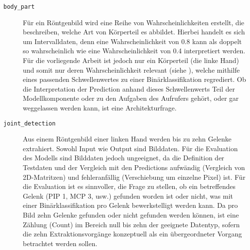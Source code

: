 \begin{description}
    \item[\texttt{body\_part}] Für ein Röntgenbild wird eine Reihe von Wahrscheinlichkeiten erstellt, die beschreiben, welche Art von Körperteil es abbildet. Hierbei handelt es sich um Intervalldaten, denn eine Wahrscheinlichkeit von 0.8 kann als doppelt so wahrscheinlich wie eine Wahrscheinlichkeit von 0.4 interpretiert werden. Für die vorliegende Arbeit ist jedoch nur ein Körperteil (die linke Hand) und somit nur deren Wahrscheinlichkeit relevant (siehe ), welche mithilfe eines passenden Schwellenwertes zu einer Binärklassifikation regrediert. Ob die Interpretation der Prediction anhand dieses Schwellenwerts Teil der Modellkomponente oder zu den Aufgaben des Aufrufers gehört, oder gar weggelassen werden kann, ist eine Architekturfrage.
    \item[\texttt{joint\_detection}] Aus einem Röntgenbild einer linken Hand werden bis zu zehn Gelenke extrahiert. Sowohl Input wie Output sind Bilddaten. Für die Evaluation des Modells sind Bilddaten jedoch ungeeignet, da die Definition der Testdaten und der Vergleich mit den Predictions aufwändig (Vergleich von 2D-Matritzen) und fehleranfällig (Verschiebung um einzelne Pixel) ist. Für die Evaluation ist es sinnvoller, die Frage zu stellen, ob ein betreffendes Gelenk (PIP 1, MCP 3, usw.) gefunden worden ist oder nicht, was mit einer Binärklassifikation pro Gelenk bewerkstelligt werden kann. Da pro Bild zehn Gelenke gefunden oder nicht gefunden werden können, ist eine Zählung (Count) im Bereich null bis zehn der geeignete Datentyp, sofern die zehn Extraktionsvorgänge konzeptuell als ein übergeordneter Vorgang betrachtet werden sollen.

\end{description}
